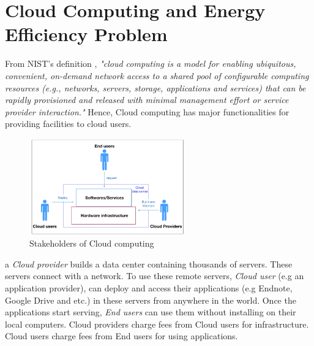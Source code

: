 \section{Cloud Computing and Energy Efficiency Problem}
\label{sec:background}


 From NIST's definition \cite{Mell:2011jj}, \textit{"cloud computing is a model for enabling ubiquitous, convenient, on-demand network access to a shared pool of configurable computing resources (e.g., networks, servers, storage, applications and services) that can be rapidly provisioned and released with minimal management effort or service provider interaction."} Hence, Cloud computing has major functionalities for providing facilities to cloud users.

\begin{figure}
	\centering
	\includegraphics[width=0.6\textwidth]{pics/stakeholders.png}
	\caption{Stakeholders of Cloud computing \cite{Jennings:2015ht}}
	\label{fig:stakeholders}
\end{figure}

 a \emph{Cloud provider} builds a data center containing thousands of servers. These servers connect with a network. 
To use these remote servers, \emph{Cloud user} (e.g an application provider), can deploy and access their applications (e.g Endnote, Google Drive and etc.) in these servers from anywhere in the world. Once the applications start serving, \emph{End users} can use them without installing on their local computers. Cloud providers charge fees from Cloud users for infrastructure. Cloud users charge fees from End users for using applications. 

